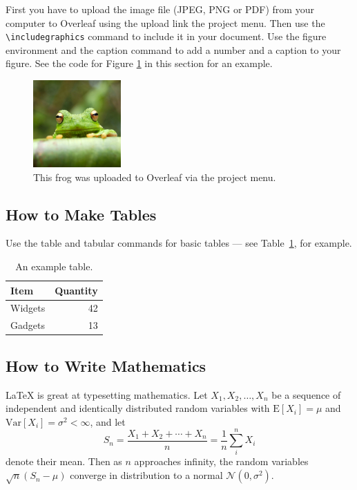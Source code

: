 \documentclass[a4paper]{article}
\begin{document}
First you have to upload the image file (JPEG, PNG or PDF) from your computer to Overleaf using the upload link the project menu. Then use the \verb|\includegraphics| command to include it in your document. Use the figure environment and the caption command to add a number and a caption to your figure. See the code for Figure \ref{fig:frog} in this section for an example.

\begin{figure}
\centering
\includegraphics[width=0.3\textwidth]{frog.jpg}
\caption{\label{fig:frog}This frog was uploaded to Overleaf via the project menu.}
\end{figure}

\subsection{How to Make Tables}

Use the table and tabular commands for basic tables --- see Table~\ref{tab:widgets}, for example.

\begin{table}
\centering
\begin{tabular}{l|r}
Item & Quantity \\\hline
Widgets & 42 \\
Gadgets & 13
\end{tabular}
\caption{\label{tab:widgets}An example table.}
\end{table}

\subsection{How to Write Mathematics}

\LaTeX{} is great at typesetting mathematics. Let $X_1, X_2, \ldots, X_n$ be a sequence of independent and identically distributed random variables with $\text{E}[X_i] = \mu$ and $\text{Var}[X_i] = \sigma^2 < \infty$, and let
$$S_n = \frac{X_1 + X_2 + \cdots + X_n}{n}
      = \frac{1}{n}\sum_{i}^{n} X_i$$
denote their mean. Then as $n$ approaches infinity, the random variables $\sqrt{n}(S_n - \mu)$ converge in distribution to a normal $\mathcal{N}(0, \sigma^2)$.
\end{document}
